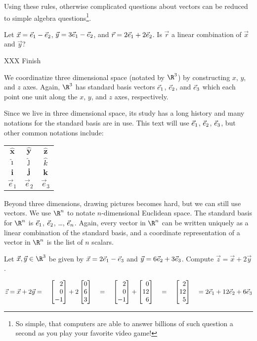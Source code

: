 Using these rules, otherwise complicated questions about vectors can be reduced
to simple algebra questions\footnote{ So simple, that computers are able to answer billions of
such question a second as you play your favorite video game!}.

\begin{example}
	Let $\vec x={\vec e_1}-{\vec e_2}$, $\vec y=3{\vec e_1}-{\vec e_2}$, and $\vec r=2{\vec e_1}+2{\vec e_2}$. Is
	$\vec r$ a linear combination of $\vec x$ and $\vec y$?

	XXX Finish
\end{example}

We coordinatize three dimensional space (notated by $\R^3$) by constructing $x$, $y$, and $z$ axes.
Again, $\R^3$ has standard basis vectors ${\vec e_1}$, ${\vec e_2}$, and ${\vec e_3}$ which each
point one unit along the $x$, $y$, and $z$ axes, respectively.

Since we live in three dimensional space, its study has a long history and many notations
for the standard basis are in use. This text will use ${\vec e_1}$, ${\vec e_2}$, ${\vec e_3}$, but other common
notations include:
\begin{center}
	\begin{tabular}{c  c  c}
		$\hat{\mathbf{x}}$ & $\hat{\mathbf{y}}$ &$\hat{\mathbf{z}}$\\
		$\hat{\imath}$ & $\hat{\jmath}$ &$\hat{k}$\\
		$\mathbf{i}$ & $\mathbf j$ & $\mathbf k$\\
		$\vec e_1$ & $\vec e_2$ & $\vec e_3$
	\end{tabular}
\end{center}

Beyond three dimensions, drawing pictures becomes hard, but we can still use vectors.
We use $\R^n$ to notate $n$-dimensional Euclidean space. The standard basis for $\R^n$ is
$\vec { e}_{1}$, $\vec { e}_{2}$, \ldots, $\vec { e}_{n}$. Again, every vector in $\R^n$ can be written
uniquely as a linear combination of the standard basis, and a coordinate representation
of a vector in $\R^n$ is the list of $n$ scalars.

\begin{example}
	Let $\vec x,\vec y\in\R^3$ be given by $\vec x=2{\vec e_1}-{\vec e_3}$ and $\vec y=6{\vec e_2}+3{\vec e_3}$.
	Compute $\vec z=\vec x+2\vec y$.

	\[
		\vec z=\vec x+2\vec y=\quad\mat{2\\0\\-1}+2\mat{0\\6\\3}\quad
		=\quad\mat{2\\0\\-1}+\mat{0\\12\\6}\quad=\quad\mat{2\\12\\5}\quad=2\xhat+12\yhat+6\zhat
	\]
\end{example}
